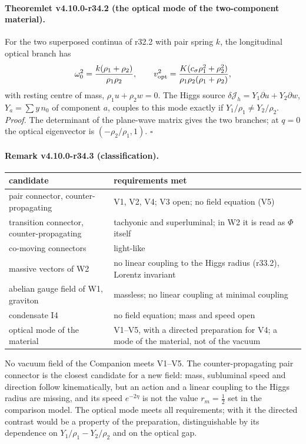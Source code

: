 \paragraph{Theoremlet v4.10.0-r34.2 (the optical mode of the two-component material).}
For the two superposed continua of r32.2 with pair spring \(k\), the longitudinal optical branch has
\[
 \omega_0^2=\frac{k(\rho_1+\rho_2)}{\rho_1\rho_2},\qquad
 v_{\rm opt}^2=\frac{K(c_\sigma\rho_1^2+\rho_2^2)}{\rho_1\rho_2(\rho_1+\rho_2)},
\]
with resting centre of mass, \(\rho_1u+\rho_2w=0\).  The Higgs source \(\delta\mathcal J_h=Y_1\partial u+Y_2\partial w\), \(Y_a=\sum y\,n_0\) of component \(a\),
couples to this mode exactly if \(Y_1/\rho_1\neq Y_2/\rho_2\).  \emph{Proof.} The determinant of the plane-wave matrix gives the two
branches; at \(q=0\) the optical eigenvector is \((-\rho_2/\rho_1,1)\).  \(\square\)

\paragraph{Remark v4.10.0-r34.3 (classification).}
\begin{center}
\small
\begin{tabular}{@{}>{\raggedright\arraybackslash}p{}>{\raggedright\arraybackslash}p{}@{}}
\toprule
candidate & requirements met\\
\midrule
pair connector, counter-propagating & V1, V2, V4; V3 open; no field equation (V5)\\
transition connector, counter-propagating & tachyonic and superluminal; in W2 it is read as \(\Phi\) itself\\
co-moving connectors & light-like\\
massive vectors of W2 & no linear coupling to the Higgs radius (r33.2), Lorentz invariant\\
abelian gauge field of W1, graviton & massless; no linear coupling at minimal coupling\\
condensate I4 & no field equation; mass and speed open\\
optical mode of the material & V1--V5, with a directed preparation for V4; a mode of the material, not of the vacuum\\
\bottomrule
\end{tabular}
\end{center}
No vacuum field of the Companion meets V1--V5.  The counter-propagating pair connector is the closest candidate for a new field: mass,
subluminal speed and direction follow kinematically, but an action and a linear coupling to the Higgs radius are missing, and its speed
\(e^{-2\eta}\) is not the value \(r_m=\tfrac12\) set in the comparison model.  The optical mode meets all requirements; with it the directed
contrast would be a property of the preparation, distinguishable by its dependence on \(Y_1/\rho_1-Y_2/\rho_2\) and on the optical gap.

